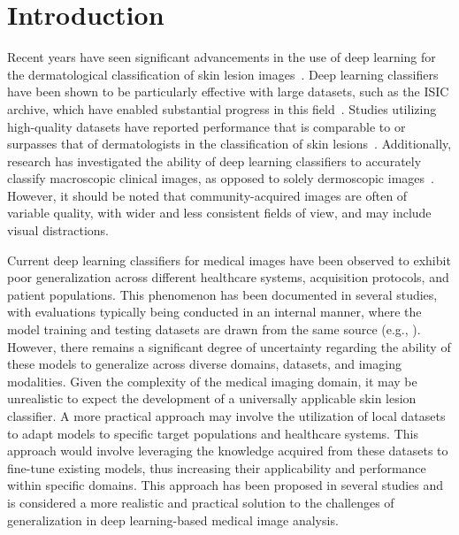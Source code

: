 \section{Introduction}
\label{sec:generalisation_intro}
Recent years have seen significant advancements in the use of deep learning for the dermatological classification of skin lesion images~\citep{du2020ai,wu2022skin}. Deep learning classifiers have been shown to be particularly effective with large datasets, such as the ISIC archive, which have enabled substantial progress in this field~\citep{tschandl2018ham10000,wen2021characteristics}. Studies utilizing high-quality datasets have reported performance that is comparable to or surpasses that of dermatologists in the classification of skin lesions~\citep{esteva2017dermatologist,haenssle2018man,han2018classification,tschandl2019expert}. Additionally, research has investigated the ability of deep learning classifiers to accurately classify macroscopic clinical images, as opposed to solely dermoscopic images~\citep{fujisawa2019deep}. However, it should be noted that community-acquired images are often of variable quality, with wider and less consistent fields of view, and may include visual distractions.

Current deep learning classifiers for medical images have been observed to exhibit poor generalization across different healthcare systems, acquisition protocols, and patient populations. This phenomenon has been documented in several studies, with evaluations typically being conducted in an internal manner, where the model training and testing datasets are drawn from the same source (e.g., \cite{han2018classification}). However, there remains a significant degree of uncertainty regarding the ability of these models to generalize across diverse domains, datasets, and imaging modalities.
Given the complexity of the medical imaging domain, it may be unrealistic to expect the development of a universally applicable skin lesion classifier. A more practical approach may involve the utilization of local datasets to adapt models to specific target populations and healthcare systems. This approach would involve leveraging the knowledge acquired from these datasets to fine-tune existing models, thus increasing their applicability and performance within specific domains. This approach has been proposed in several studies and is considered a more realistic and practical solution to the challenges of generalization in deep learning-based medical image analysis.

